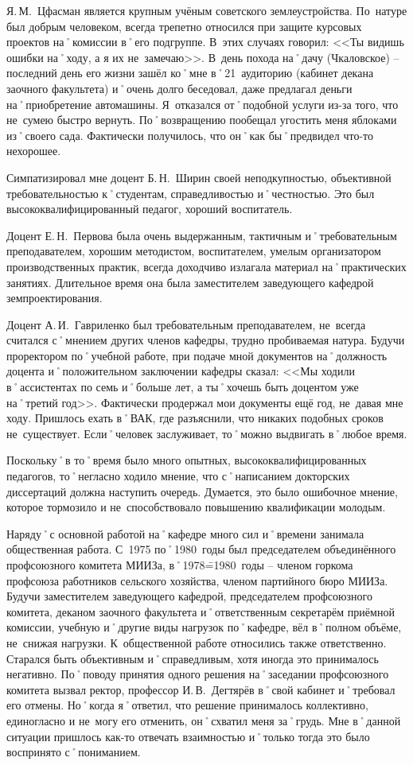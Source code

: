 Я.\,М.~Цфасман является крупным учёным советского землеустройства. По~натуре был добрым человеком, всегда трепетно относился при защите курсовых проектов на˚комиссии в˚его подгруппе. В~этих случаях говорил: <<Ты видишь ошибки на˚ходу, а я их не~замечаю>>. В~день похода на˚дачу (Чкаловское) \--- последний день его жизни зашёл ко˚мне в˚21~аудиторию (кабинет декана заочного факультета) и˚очень долго беседовал, даже предлагал деньги на˚приобретение автомашины. Я~отказался от˚подобной услуги из-за того, что не~сумею быстро вернуть. По˚возвращению пообещал угостить меня яблоками из˚своего сада. Фактически получилось, что он˚как бы˚предвидел что-то нехорошее.

Симпатизировал мне доцент Б.\,Н.~Ширин своей неподкупностью, объективной требовательностью к˚студентам, справедливостью и˚честностью. Это был высококвалифицированный педагог, хороший воспитатель.

Доцент Е.\,Н.~Первова была очень выдержанным, тактичным и˚требовательным преподавателем, хорошим методистом, воспитателем, умелым организатором производственных практик, всегда доходчиво излагала материал на˚практических занятиях. Длительное время она была заместителем заведующего кафедрой земпроектирования.

Доцент А.\,И.~Гавриленко был требовательным преподавателем, не~всегда считался с˚мнением других членов кафедры, трудно пробиваемая натура. Будучи проректором по˚учебной работе, при подаче мной документов на˚должность доцента и˚положительном заключении кафедры сказал: <<Мы ходили в˚ассистентах по семь и˚больше лет, а ты˚хочешь быть доцентом уже на˚третий год>>. Фактически продержал мои документы ещё год, не~давая мне ходу. Пришлось ехать в˚ВАК, где разъяснили, что никаких подобных сроков не~существует. Если˚человек заслуживает, то˚можно выдвигать в˚любое время.

Поскольку˚в то˚время было много опытных, высококвалифицированных педагогов, то˚негласно ходило мнение, что с˚написанием докторских диссертаций должна наступить очередь. Думается, это было ошибочное мнение, которое тормозило и не~способствовало повышению квалификации молодым.

Наряду˚с основной работой на˚кафедре много сил и˚времени занимала общественная работа. С~1975 по˚1980~годы был председателем объединённого профсоюзного комитета МИИЗа, в˚1978\==1980~годы \--- членом горкома профсоюза работников сельского хозяйства, членом партийного бюро МИИЗа. Будучи заместителем заведующего кафедрой, председателем профсоюзного комитета, деканом заочного факультета и˚ответственным секретарём приёмной комиссии, учебную и˚другие виды нагрузок по˚кафедре, вёл в˚полном объёме, не~снижая нагрузки. К~общественной работе относились также ответственно. Старался быть объективным и˚справедливым, хотя иногда это принималось негативно. По˚поводу принятия одного решения на˚заседании профсоюзного комитета вызвал ректор, профессор И.\,В.~Дегтярёв в˚свой кабинет и˚требовал его отмены. Но˚когда я˚ответил, что решение принималось коллективно, единогласно и не~могу его отменить, он˚схватил меня за˚грудь. Мне в˚данной ситуации пришлось как-то отвечать взаимностью и˚только тогда это было воспринято с˚пониманием.

